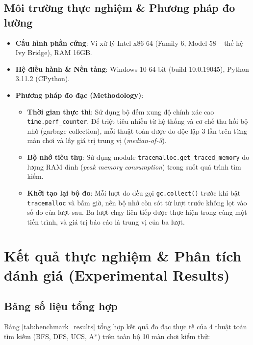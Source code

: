 \documentclass[12pt,a4paper]{article}
\begin{document}
\subsection{Môi trường thực nghiệm \& Phương pháp đo lường}
\begin{itemize}
    \item \textbf{Cấu hình phần cứng}: Vi xử lý Intel x86-64 (Family 6, Model 58 -- thế hệ Ivy Bridge), RAM 16GB.
    \item \textbf{Hệ điều hành \& Nền tảng}: Windows 10 64-bit (build 10.0.19045), Python 3.11.2 (CPython).
    \item \textbf{Phương pháp đo đạc (Methodology)}:
    \begin{itemize}
        \item \textbf{Thời gian thực thi}: Sử dụng bộ đếm xung độ chính xác cao \texttt{time.perf\_counter}. Để triệt tiêu nhiễu từ hệ thống và cơ chế thu hồi bộ nhớ (garbage collection), mỗi thuật toán được đo độc lập 3 lần trên từng màn chơi và lấy giá trị trung vị (\textit{median-of-3}).
        \item \textbf{Bộ nhớ tiêu thụ}: Sử dụng module \texttt{tracemalloc.get\_traced\_memory} đo lượng RAM đỉnh (\textit{peak memory consumption}) trong suốt quá trình tìm kiếm.
        \item \textbf{Khởi tạo lại bộ đo}: Mỗi lượt đo đều gọi \texttt{gc.collect()} trước khi bật \texttt{tracemalloc} và bấm giờ, nên bộ nhớ còn sót từ lượt trước không lọt vào số đo của lượt sau. Ba lượt chạy liên tiếp được thực hiện trong cùng một tiến trình, và giá trị báo cáo là trung vị của ba lượt.
    \end{itemize}
\end{itemize}

\section{Kết quả thực nghiệm \& Phân tích đánh giá (Experimental Results)}

\subsection{Bảng số liệu tổng hợp}
Bảng \ref{tab:benchmark_results} tổng hợp kết quả đo đạc thực tế của 4 thuật toán tìm kiếm (BFS, DFS, UCS, A*) trên toàn bộ 10 màn chơi kiểm thử:
\end{document}
